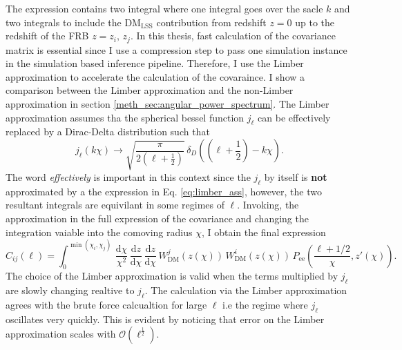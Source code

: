 The expression contains two integral where one integral goes over the sacle $k$ and two integrals to include the $\mathrm{DM}_\mathrm{LSS}$ contribution from redshift $z = 0$ up to the redshift of the FRB $z = z_i , \, z_j$. In this thesis, fast calculation of the covariance matrix is essential since I use a compression step to pass one simulation instance in the simulation based inference pipeline. Therefore, I use the Limber approximation \citep{limber1953analysis} to accelerate the calculation of the covaraince. I show a comparison between the Limber approximation and the non-Limber approximation in section \ref{meth_sec:angular_power_spectrum}. The Limber approximation assumes tha the spherical bessel function $j_\ell$ can be effectively replaced by a Dirac-Delta distribution such that
\begin{equation} \label{eq:limber_ass}
    j_\ell(k \chi) \to \sqrt{\frac{\pi}{2(\ell + \frac{1}{2})}} \, \delta_D((\ell + \frac{1}{2}) - k\chi).
\end{equation}
The word \textit{effectively} is important in this context since the $j_\ell$ by itself is \textbf{not} approximated by a the expression in Eq. \ref{eq:limber_ass}, however, the two resultant integrals are equivilant in some regimes of $\ell$. Invoking, the approximation in the full expression of the covariance and changing the integration vaiable into the comoving radius $\chi$, I obtain the final expression
\begin{equation}
    C_{ij}(\ell) = \int_0^{\min(\chi_i , \chi_j )}  \, \frac{\mathrm{d}\chi}{\chi^2} \, \frac{\mathrm{d}z}{\mathrm{d}\chi} \, \frac{\mathrm{d}z}{\mathrm{d}\chi}  \,W_{\mathrm{DM}}^j(z(\chi)) \, W_{\mathrm{DM}}^i(z(\chi)) \, P_{\mathrm{ee}}\!\left(\frac{\ell + 1/2}{\chi}, z'(\chi)\right).
\end{equation}
The choice of the Limber approximation is valid when the terms multiplied by $j_\ell$ are slowly changing realtive to $j_\ell$. The calculation via the Limber approximation agrees with the brute force calcualtion for large $\ell$ i.e the regime where $j_\ell$ oscillates very quickly. This is evident by noticing that error on the Limber approximation scales with $\mathcal{O}(\ell^\frac{1}{2})$.

